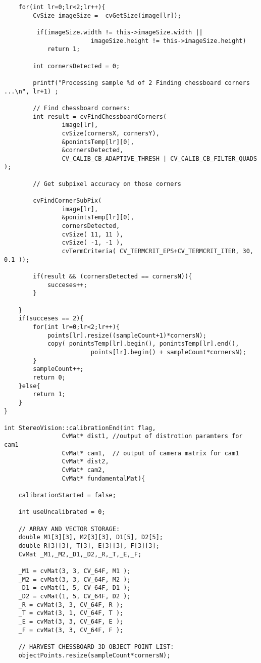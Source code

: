 \begin{lstlisting}
    for(int lr=0;lr<2;lr++){
        CvSize imageSize =  cvGetSize(image[lr]);

         if(imageSize.width != this->imageSize.width || 
                        imageSize.height != this->imageSize.height)
            return 1;

        int cornersDetected = 0;

        printf("Processing sample %d of 2 Finding chessboard corners ...\n", lr+1) ;

		// Find chessboard corners:
		int result = cvFindChessboardCorners(
				image[lr],
				cvSize(cornersX, cornersY),
				&ponintsTemp[lr][0],
				&cornersDetected,
				CV_CALIB_CB_ADAPTIVE_THRESH | CV_CALIB_CB_FILTER_QUADS );

		// Get subpixel accuracy on those corners

		cvFindCornerSubPix(
				image[lr],
				&ponintsTemp[lr][0],
				cornersDetected,
				cvSize( 11, 11 ),
				cvSize( -1, -1 ),
				cvTermCriteria( CV_TERMCRIT_EPS+CV_TERMCRIT_ITER, 30, 0.1 ));

        if(result && (cornersDetected == cornersN)){
            succeses++;
        }

    }
    if(succeses == 2){
        for(int lr=0;lr<2;lr++){
            points[lr].resize((sampleCount+1)*cornersN);
            copy( ponintsTemp[lr].begin(), ponintsTemp[lr].end(), 
                        points[lr].begin() + sampleCount*cornersN);
        }
        sampleCount++;
        return 0;
    }else{
        return 1;
    }
}

int StereoVision::calibrationEnd(int flag,
				CvMat* dist1, //output of distrotion paramters for cam1
				CvMat* cam1,  // output of camera matrix for cam1
				CvMat* dist2,
				CvMat* cam2,
				CvMat* fundamentalMat){

    calibrationStarted = false;

    int useUncalibrated = 0;

    // ARRAY AND VECTOR STORAGE:
    double M1[3][3], M2[3][3], D1[5], D2[5];
    double R[3][3], T[3], E[3][3], F[3][3];
    CvMat _M1,_M2,_D1,_D2,_R,_T,_E,_F;

    _M1 = cvMat(3, 3, CV_64F, M1 );
    _M2 = cvMat(3, 3, CV_64F, M2 );
    _D1 = cvMat(1, 5, CV_64F, D1 );
    _D2 = cvMat(1, 5, CV_64F, D2 );
    _R = cvMat(3, 3, CV_64F, R );
    _T = cvMat(3, 1, CV_64F, T );
    _E = cvMat(3, 3, CV_64F, E );
    _F = cvMat(3, 3, CV_64F, F );

    // HARVEST CHESSBOARD 3D OBJECT POINT LIST:
    objectPoints.resize(sampleCount*cornersN);


\end{lstlisting}
